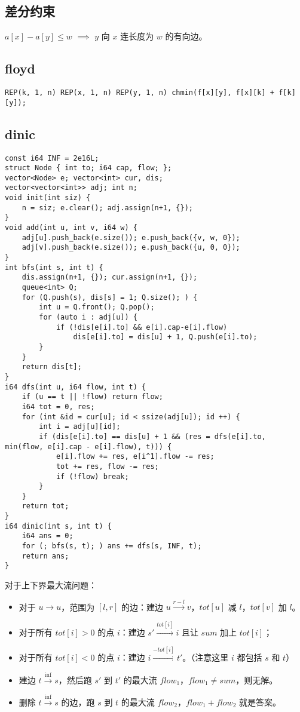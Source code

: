 \documentclass[a4paper,landscape,twocolumn]{ctexart}
\begin{document}
\subsection{差分约束}

$ a[x] - a[y] \leq w$ $\implies$ $y$ 向 $x$ 连长度为 $w$ 的有向边。

\subsection{floyd}

\begin{lstlisting}
REP(k, 1, n) REP(x, 1, n) REP(y, 1, n) chmin(f[x][y], f[x][k] + f[k][y]);
\end{lstlisting}

\subsection{dinic}

\begin{lstlisting}
const i64 INF = 2e16L;
struct Node { int to; i64 cap, flow; };
vector<Node> e; vector<int> cur, dis;
vector<vector<int>> adj; int n;
void init(int siz) {
	n = siz; e.clear(); adj.assign(n+1, {});
}
void add(int u, int v, i64 w) {
	adj[u].push_back(e.size()); e.push_back({v, w, 0});
	adj[v].push_back(e.size()); e.push_back({u, 0, 0});
}
int bfs(int s, int t) {
	dis.assign(n+1, {}); cur.assign(n+1, {});
	queue<int> Q;
	for (Q.push(s), dis[s] = 1; Q.size(); ) {
		int u = Q.front(); Q.pop();
		for (auto i : adj[u]) {
			if (!dis[e[i].to] && e[i].cap-e[i].flow)
				dis[e[i].to] = dis[u] + 1, Q.push(e[i].to);
		}
	}
	return dis[t];
}
i64 dfs(int u, i64 flow, int t) {
	if (u == t || !flow) return flow;
	i64 tot = 0, res;
	for (int &id = cur[u]; id < ssize(adj[u]); id ++) {
		int i = adj[u][id];
		if (dis[e[i].to] == dis[u] + 1 && (res = dfs(e[i].to, min(flow, e[i].cap - e[i].flow), t))) {
			e[i].flow += res, e[i^1].flow -= res;
			tot += res, flow -= res;
			if (!flow) break;
		}
	}
	return tot;
}
i64 dinic(int s, int t) {
	i64 ans = 0;
	for (; bfs(s, t); ) ans += dfs(s, INF, t);
	return ans;
}
\end{lstlisting}

对于上下界最大流问题：

\begin{itemize}
\item 对于 $u \to u$，范围为 $[l, r]$ 的边：建边 $u \xrightarrow{r - l} v$，$tot[u]$ 减 $l$，$tot[v]$ 加 $l$。
\item 对于所有 $tot[i] > 0$ 的点 $i$：建边 $s' \xrightarrow{tot[i]} i$ 且让 $sum$ 加上 $tot[i]$；
\item 对于所有 $tot[i] < 0$ 的点 $i$：建边 $i \xrightarrow{-tot[i]} t'$。（注意这里 $i$ 都包括 $s$ 和 $t$）
\item 建边 $t \xrightarrow{\inf} s$，然后跑 $s'$ 到 $t'$ 的最大流 $flow_1$，$flow_1 \neq sum$，则无解。
\item 删除 $t \xrightarrow{\inf} s$ 的边，跑 $s$ 到 $t$ 的最大流 $flow_2$，$flow_1 + flow_2$ 就是答案。
\end{itemize}
\end{document}
